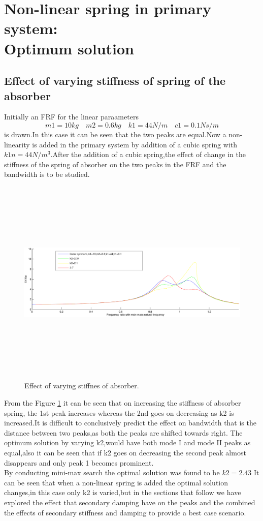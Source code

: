 \section{Non-linear spring in primary system:\\ Optimum solution}
\subsection{Effect of varying stiffness of spring of the absorber } 
Initially an FRF for the linear paraameters $$ m1=10 kg\quad m2=0.6kg\quad k1=44 N/m\quad c1=0.1 Ns/m $$ is drawn.In this case it can be seen that the two peaks are equal.Now a non-linearity is added in the primary system by addition of a cubic spring with $k1n=44 N/m^3$.After the addition of a cubic spring,the effect of change in the stiffness of the spring of absorber on the two peaks in the FRF and the bandwidth is to be studied.
\begin{figure}[h!]
\includegraphics[width=16cm,height=10cm]{"figures/nonlinearity_primaryymass_3_effect of secondaryspring"}
  \caption{Effect of varying stiffnes of absorber.}
  \label{fig:varying stiffnes of absorber}
  \end{figure}
From the Figure \ref{fig:varying stiffnes of absorber} it can be seen that on increasing the stiffness of absorber spring, the 1st peak increases whereas the 2nd  goes on decreasing as k2 is increased.It is difficult to conclusively predict the effect on bandwidth that is the distance between two peaks,as both the peaks are shifted towards right.
The optimum solution by varying k2,would have both mode I and mode II peaks as equal,also it can be seen that if k2 goes on decreasing the second peak almost disappears and only peak 1 becomes prominent.\\
By conducting mini-max search the optimal solution was found to be $k2=2.43$ It can be seen that when a non-linear spring is added the optimal solution changes,in this case only k2 is varied,but in the sections that follow we have explored the effect that secondary damping have on the peaks and the combined the effects of secondary stiffness and damping to provide a best case scenario.\\

